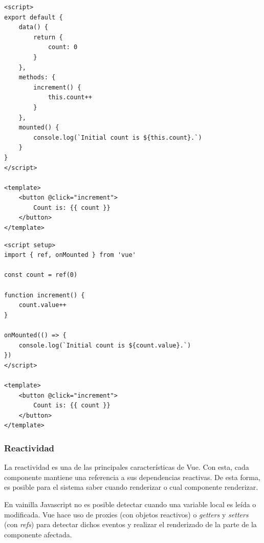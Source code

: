 \begin{center}    
\hspace{-0.65cm}\begin{minipage}{0.5\textwidth}
    \begin{lstlisting}[basicstyle=\ttfamily\tiny, numbers=none, caption=Options API.]
<script>
export default {
    data() {
        return {
            count: 0
        }
    },
    methods: {
        increment() {
            this.count++
        }
    },
    mounted() {
        console.log(`Initial count is ${this.count}.`)
    }
}
</script>

<template>
    <button @click="increment">
        Count is: {{ count }}
    </button>
</template>
    \end{lstlisting}
\end{minipage}
\begin{minipage}{0.5\textwidth}
    \begin{lstlisting}[basicstyle=\ttfamily\tiny, numbers=none, caption=Composition API.]
<script setup>
import { ref, onMounted } from 'vue'

const count = ref(0)

function increment() {
    count.value++
}

onMounted(() => {
    console.log(`Initial count is ${count.value}.`)
})
</script>

<template>
    <button @click="increment">
        Count is: {{ count }}
    </button>
</template>
    \end{lstlisting}
\end{minipage}
\end{center}

\subsubsection{Reactividad}

La reactividad es una de las principales características de Vue. Con esta, cada componente mantiene una referencia a sus dependencias reactivas. De esta forma, es posible para el sistema saber cuando renderizar o cual componente renderizar.

En vainilla Javascript no es posible detectar cuando una variable local es leída o modificada. Vue hace uso de proxies (con objetos reactivos) o \textit{getters} y \textit{setters} (con \textit{refs}) para detectar dichos eventos y realizar el renderizado de la parte de la componente afectada.

